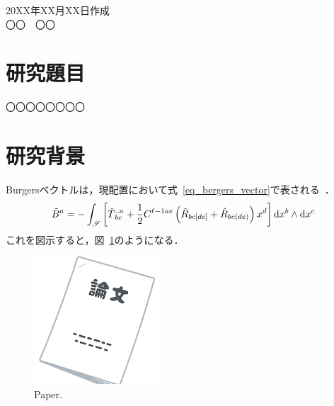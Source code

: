 \documentclass[article, paper=a4, fleqn, fontsize=10.5bp, line_length=40zw, gutter=30mm, head_space=35mm, foot_space=30mm]{jlreq}
\begin{document}
\pagestyle{empty}

\begin{center}
{ }
\end{center}
\vspace{0.3cm}
\begin{flushright}
{20XX年XX月XX日作成}
\\
{〇〇　〇〇}
\end{flushright}

\section{研究題目}
〇〇〇〇〇〇〇〇

\section{研究背景}
Burgersベクトルは，現配置において式~\eqref{eq_bergers_vector}で表される~\cite{kondo1955non-riemannian}．
%
\begin{equation}
    \label{eq_bergers_vector}
    \tilde{B}{}^{a}
    = -\int_{\mathscr{S}} \left[ \hat{T}{}^{..a}_{bc} + \frac{1}{2} C^{\ell{}-1ae} \left( \hat{R}{}_{bc[de]} + \hat{R}{}_{bc(de)} \right) x^{d} \right] \mathrm{d} x^{b} \wedge \mathrm{d} x^{c}
    \dotfill
\end{equation}
%
これを図示すると，図~\ref{fig_paper_irasutoya}のようになる．
%
\begin{figure}[bp]
    \centering
    \includegraphics{./figure/document_ronbun_taba.png}
    \caption{Paper.}
    \label{fig_paper_irasutoya}
\end{figure}
%



\end{document}
